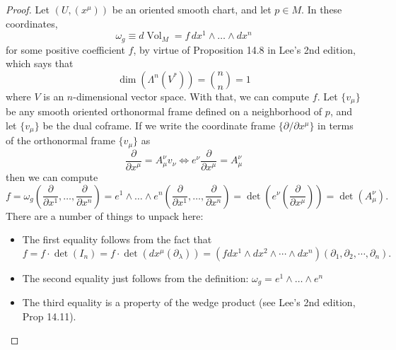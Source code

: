 \documentclass{article}
\theoremstyle{definition}
\renewcommand\det{\operatorname{det}}
\newcommand{\p}{\partial}
\newcommand{\f}[2]{\frac{#1}{#2}}
\newcommand{\lp}{\left(}
\newcommand{\rp}{\right)}
\theoremstyle{theorem}
\newcommand{\Vol}{\operatorname{Vol}}
\begin{document}
\begin{proof}
Let $(U, (x^\mu))$ be an oriented smooth chart, and let $p\in M$. In these coordinates, \begin{equation*}
    \omega_g \equiv d\Vol_M = f \,dx^1 \land \dots \land dx^n
\end{equation*}
for some positive coefficient $f$, by virtue of Proposition 14.8 in Lee's 2nd edition, which says that 
\begin{equation*}
    \dim(\Lambda^n(V^*)) = {n\choose {n}} = 1
\end{equation*}
where $V$ is an $n$-dimensional vector space.
With that, we can compute $f$. Let $\{ v_\mu \}$ be any smooth oriented orthonormal frame defined on a neighborhood of $p$, and let $\{v_\mu \}$ be the dual coframe. If we write the coordinate frame $\{ \p/\p x^\mu \}$ in terms of the orthonormal frame $\{v_\mu \}$ as 
\begin{equation*}
    \f{\p}{\p x^\mu} = A^\nu_\mu v_\nu \iff e^\nu \f{\p}{\p x^\mu} = A^\nu_\mu
\end{equation*}
then we can compute
\begin{equation*}
    f = \omega_g\lp \f{\p}{\p x^1},\dots, \f{\p}{\p x^n} \rp = e^1 \land \dots \land e^n \lp  \f{\p}{\p x^1},\dots, \f{\p}{\p x^n}  \rp = \det\lp e^\nu \lp \f{\p}{\p x^\mu} \rp \rp = \det(A^\nu_\mu).
\end{equation*}
There are a number of things to unpack here:
\begin{itemize}
    \item The first equality follows from the fact that
    \begin{equation*}
    f=f\cdot\det(I_n)=f\cdot \det(dx^\mu(\partial_{\lambda}))=(fdx^1\land dx^2\land\cdots\land dx^n)(\partial_1,\partial_2,\cdots,\partial_n).
    \end{equation*}
    \item The second equality just follows from the definition: $\omega_g = e^1\land \dots \land e^n$
    
    \item The third equality is a property of the wedge product (see Lee's 2nd edition, Prop 14.11).
    

\end{itemize}
\end{proof}
\end{document}
